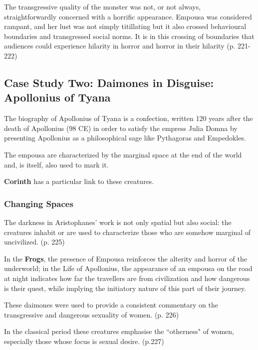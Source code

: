 The transgressive quality of the monster was not, or not always, straightforwardly concerned with a horrific appearance. Empousa was considered rampant, and her lust was not simply titillating but it also crossed behavioural boundaries and transgressed social norms. It is in this crossing of boundaries that audiences could experience hilarity in horror and horror in their hilarity (p. 221-222)


\subsection{Case Study Two: Daimones in Disguise: Apollonius of Tyana}

The biography of Apollonius of Tyana is a confection, written 120 years after the death of Apollonius (98 CE) in order to satisfy the empress Julia Domna by presenting Apollonius as a philosophical sage like Pythagoras and Empedokles.

The empousa are characterized by the marginal space at the end of the world and, is itself, also used to mark it.

\begin{rmk}
    \textbf{Corinth} has a particular link to these creatures.
\end{rmk}


\subsubsection{Changing Spaces}

The darkness in Aristophanes' work is not only spatial but also social: the creatures inhabit or are used to characterize those who are somehow marginal of uncivilized. (p. 225)

\begin{rmk}
    In the \textbf{Frogs}, the presence of Empousa reinforces the alterity and horror of the underworld; in the Life of Apollonius, the appearance of an empousa on the road at night indicates how far the travellers are from civilization and how dangerous is their quest, while implying the initiatory nature of this part of their journey. 
\end{rmk}

These daimones were used to provide a consistent commentary on the transgressive and dangerous sexuality of women. (p. 226)

In the classical period these creatures emphasise the ``otherness" of women, especially those whose focus is sexual desire. (p.227)

